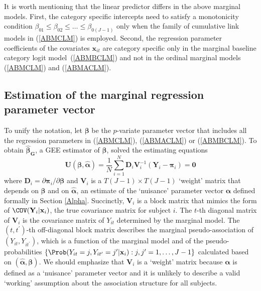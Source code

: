 \documentclass[article,shortnames,nojss]{jss}
\begin{document}
It is worth mentioning that the linear predictor differs in the above marginal models. First, the category specific intercepts need to satisfy a monotonicity condition $\beta_{01}\leq\beta_{02}\leq \ldots \leq \beta_{0(J-1)}$ only when the family of cumulative link models in (\ref{ABMCLM}) is employed. Second, the regression parameter coefficients of the covariates $\mathbf x_{it}$ are category specific only in the marginal baseline category logit model~(\ref{ABMBCLM}) and not in the ordinal marginal models (\ref{ABMCLM}) and (\ref{ABMACLM}).

\subsection{Estimation of the marginal regression parameter vector}
To unify the notation, let $\boldsymbol \beta$ be the $p$-variate parameter vector that includes all the regression parameters in (\ref{ABMCLM}), (\ref{ABMACLM}) or (\ref{ABMBCLM}). To obtain $\boldsymbol {\widehat \beta_G}$, a GEE estimator of $\boldsymbol \beta$, \cite{Touloumis2012} solved the estimating equations
\begin{equation}
\mathbf{U}(\boldsymbol \beta,\widehat{\boldsymbol \alpha})=\frac{1}{N}\sum_{i=1}^N \mathbf{D}_i \mathbf V^{-1}_{i} (\mathbf {Y}_i-\boldsymbol{\pi}_i)=\mathbf{0}
\label{EEbeta}
\end{equation} 
where $\mathbf{D}_i=\partial \boldsymbol{\pi}_i/\partial \boldsymbol{\beta}$ and $\mathbf V_i$ is a $T(J-1) \times T(J-1)$ `weight' matrix that depends on $\boldsymbol \beta$ and on $\widehat{\boldsymbol \alpha}$, an estimate of the `nuisance' parameter vector $\boldsymbol \alpha$ defined formally in Section \ref{Alpha}. Succinctly, $\mathbf V_i$ is a block matrix that mimics the form of $\COV(\mathbf{Y}_i|\mathbf x_i)$, the true covariance matrix for subject $i$. The $t$-th diagonal matrix of $\mathbf V_i$ is the covariance matrix of $Y_{it}$ determined by the marginal model. The $(t,t^{\prime})$-th off-diagonal block matrix describes the marginal pseudo-association of $(Y_{it},Y_{it^{\prime}})$, which is a function of the marginal model and of the pseudo-probabilities $\{\Prob(Y_{it}=j,Y_{it^{\prime}}=j^{\prime}|\mathbf x_i):j,j^{\prime}=1,\ldots,J-1\}$ calculated based on $(\widehat{\boldsymbol \alpha},\boldsymbol \beta)$. We should emphasize that $\mathbf V_i$ is a `weight' matrix because $\boldsymbol \alpha$ is defined as a `nuisance' parameter vector and it is unlikely to describe a valid `working' assumption about the association structure for all subjects.
\end{document}
